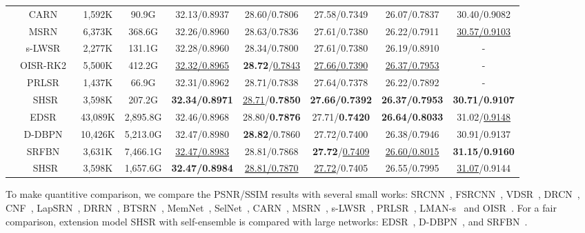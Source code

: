 \documentclass[manuscript,screen]{acmart}
\begin{document}
\begin{table*}[t]
\begin{tabular}{|c|c|c|c|c|c|c|c|c|}
		&CARN~\cite{carn_eccv2018}&1,592K&90.9G& 
		32.13/0.8937& 28.60/0.7806& 27.58/0.7349& 26.07/0.7837& 30.40/0.9082\\
		
		&MSRN~\cite{msrn_eccv2018}&6,373K& 368.6G& 
		32.26/0.8960& 28.63/0.7836& 27.61/0.7380& 26.22/0.7911& \underline{30.57/0.9103} \\
		
		& s-LWSR~\cite{s_LWSR_tip2020}& 2,277K& 131.1G&
		32.28/0.8960& 28.34/0.7800& 27.61/0.7380& 26.19/0.8910& - \\
		
		&OISR-RK2~\cite{oisr_cvpr2019}&5,500K&412.2G&
		\underline{32.32/0.8965}& \textbf{28.72}/\underline{0.7843}& \underline{27.66/0.7390}& \underline{26.37/0.7953}& - \\
		
		&PRLSR~\cite{prlsr_icassp2020}& 1,437K& 66.9G&
		32.31/0.8962& 28.71/0.7838& 27.64/0.7378& 26.22/0.7892& - \\
		
		&SHSR&3,598K& 207.2G& 
		\textbf{32.34/0.8971}& \underline{28.71}/\textbf{0.7850}& \textbf{27.66/0.7392}& \textbf{26.37/0.7953}& \textbf{30.71/0.9107}  \\
		
		\cline{2-9}
		
		&EDSR~\cite{edsr_cvpr2017}&43,089K& 2,895.8G& 32.46/0.8968& 28.80/\textbf{0.7876}& 27.71/\textbf{0.7420}& \textbf{26.64/0.8033}& 31.02/\underline{0.9148}\\
		
		&D-DBPN~\cite{dbpn_pami2020}&10,426K& 5,213.0G& 32.47/0.8980& \textbf{28.82}/0.7860& 27.72/0.7400& 26.38/0.7946&30.91/0.9137\\
		
		&SRFBN~\cite{srfbn_cvpr2019}&3,631K& 7,466.1G& \underline{32.47/0.8983}& 28.81/0.7868& \textbf{27.72}/\underline{0.7409}& \underline{26.60/0.8015}& \textbf{31.15/0.9160}\\
		


		&SHSR&3,598K& 1,657.6G&\textbf{32.47/0.8984}& \underline{28.81/0.7870}& \underline{27.72}/0.7405& 26.55/0.7995& \underline{31.07}/0.9144 \\
		\hline
		
	\end{tabular}
\end{table*}

To make quantitive comparison, we compare the PSNR/SSIM results with several small works: SRCNN~\cite{srcnn_pami2016}, FSRCNN~\cite{fsrcnn_eccv2016}, VDSR~\cite{vdsr_cvpr2016}, DRCN~\cite{drcn_cvpr2016}, CNF~\cite{cnf_cvprw2017}, LapSRN~\cite{lapsrn_cvpr2017}, DRRN~\cite{drrn_cvpr2017}, BTSRN~\cite{btsrn_cvprw2017}, MemNet~\cite{memnet_iccv2017}, SelNet~\cite{selnet_cvprw2017}, CARN~\cite{carn_eccv2018}, MSRN~\cite{msrn_eccv2018}, s-LWSR~\cite{s_LWSR_tip2020}, PRLSR~\cite{prlsr_icassp2020}, LMAN-s~\cite{lman_tob2020} and OISR~\cite{oisr_cvpr2019}. 
For a fair comparison, extension model SHSR with self-ensemble is compared with large networks: EDSR~\cite{edsr_cvpr2017}, D-DBPN~\cite{dbpn_pami2020}, and SRFBN~\cite{srfbn_cvpr2019}. 
\end{document}
